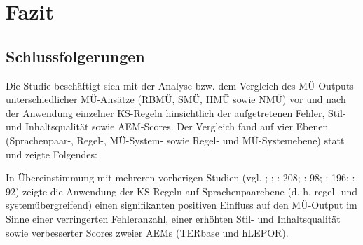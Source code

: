\chapter{\label{ch:7}Fazit}



\section{\label{sec:7.1}Schlussfolgerungen}

Die Studie beschäftigt sich mit der Analyse bzw. dem Vergleich des MÜ-Outputs unterschiedlicher MÜ-Ansätze (RBMÜ, SMÜ, HMÜ sowie NMÜ) vor und nach der Anwendung einzelner KS-Regeln hinsichtlich der aufgetretenen Fehler, Stil- und Inhaltsqualität sowie AEM-Scores. Der Vergleich fand auf vier Ebenen (Spra\-chen\-paar-, Regel-, MÜ-System- sowie Regel- und MÜ-Systemebene) statt und zeigte Folgendes:

In Übereinstimmung mit mehreren vorherigen Studien (vgl. \citealt{NybergMitamura1996}; \citealt{Bernth1999}; \citealt{BernthGdaniec2001}: 208; \citealt{Drugan2013}: 98; \citealt{DrewerZiegler2014}: 196; \citealt{Wittkowsky2017}: 92) zeigte die Anwendung der KS-Regeln auf Sprachenpaarebene (d. h. regel- und systemübergreifend) einen signifikanten positiven Einfluss auf den MÜ-Output im Sinne einer verringerten Fehleranzahl, einer erhöhten Stil- und Inhaltsqualität sowie verbesserter Scores zweier AEMs (TERbase und hLEPOR).

